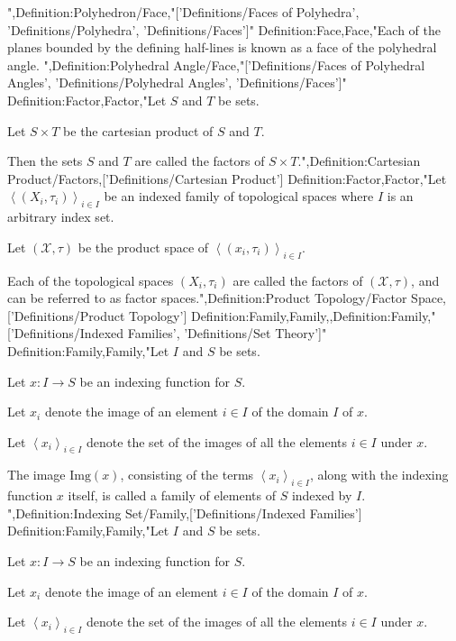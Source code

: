 ",Definition:Polyhedron/Face,"['Definitions/Faces of Polyhedra', 'Definitions/Polyhedra', 'Definitions/Faces']"
Definition:Face,Face,"Each of the planes bounded by the defining half-lines is known as a face of the polyhedral angle.
",Definition:Polyhedral Angle/Face,"['Definitions/Faces of Polyhedral Angles', 'Definitions/Polyhedral Angles', 'Definitions/Faces']"
Definition:Factor,Factor,"Let $S$ and $T$ be sets.

Let $S \times T$ be the cartesian product of $S$ and $T$.


Then the sets $S$ and $T$ are called the factors of $S \times T$.",Definition:Cartesian Product/Factors,['Definitions/Cartesian Product']
Definition:Factor,Factor,"Let $\left\langle \left( X_i, \tau_i \right)  \right\rangle_{i \mathop \in I}$ be an indexed family of topological spaces where $I$ is an arbitrary index set.

Let $\left( \mathcal X, \tau \right)$ be the product space of $\left\langle \left( x_i, \tau_i \right)  \right\rangle_{i \mathop \in I}$.


Each of the topological spaces $\left( X_i, \tau_i \right)$ are called the factors of $\left( \mathcal X, \tau \right)$, and can be referred to as factor spaces.",Definition:Product Topology/Factor Space,['Definitions/Product Topology']
Definition:Family,Family,,Definition:Family,"['Definitions/Indexed Families', 'Definitions/Set Theory']"
Definition:Family,Family,"Let $I$ and $S$ be sets.

Let $x: I \to S$ be an indexing function for $S$.

Let $x_i$ denote the image of an element $i \in I$ of the domain $I$ of $x$.

Let $\left\langle x_i \right\rangle_{i \mathop \in I}$ denote the set of the images of all the elements $i \in I$ under $x$.


The image $\mathrm {Img} \left( x \right)$, consisting of the terms $\left\langle x_i \right\rangle_{i \mathop \in I}$, along with the indexing function $x$ itself, is called a family of elements of $S$ indexed by $I$.
",Definition:Indexing Set/Family,['Definitions/Indexed Families']
Definition:Family,Family,"Let $I$ and $S$ be sets.

Let $x: I \to S$ be an indexing function for $S$.

Let $x_i$ denote the image of an element $i \in I$ of the domain $I$ of $x$.

Let $\left\langle x_i \right\rangle_{i \mathop \in I}$ denote the set of the images of all the elements $i \in I$ under $x$.


